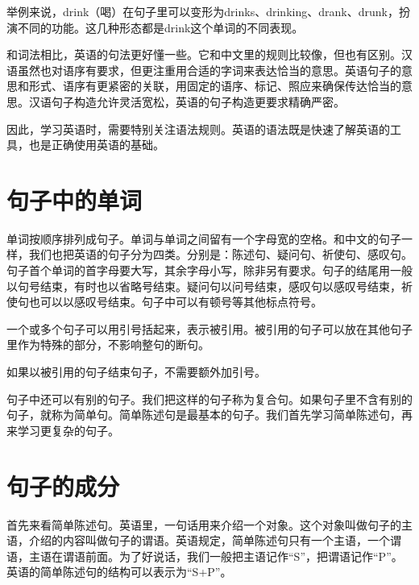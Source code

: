 \documentclass[10.5pt, a4paper]{ctexbook} %
\begin{document}
举例来说，drink（喝）在句子里可以变形为drinks、drinking、drank、drunk，扮演不同的功能。这几种形态都是drink这个单词的不同表现。

和词法相比，英语的句法更好懂一些。它和中文里的规则比较像，但也有区别。汉语虽然也对语序有要求，但更注重用合适的字词来表达恰当的意思。英语句子的意思和形式、语序有更紧密的关联，用固定的语序、标记、照应来确保传达恰当的意思。汉语句子构造允许灵活宽松，英语的句子构造更要求精确严密。

因此，学习英语时，需要特别关注语法规则。英语的语法既是快速了解英语的工具，也是正确使用英语的基础。

\section{句子中的单词}

单词按顺序排列成句子。单词与单词之间留有一个字母宽的空格。和中文的句子一样，我们也把英语的句子分为四类。分别是：陈述句、疑问句、祈使句、感叹句。句子首个单词的首字母要大写，其余字母小写，除非另有要求。句子的结尾用一般以句号结束，有时也以省略号结束。疑问句以问号结束，感叹句以感叹号结束，祈使句也可以以感叹号结束。句子中可以有顿号等其他标点符号。

一个或多个句子可以用引号括起来，表示被引用。被引用的句子可以放在其他句子里作为特殊的部分，不影响整句的断句。

\begin{liju}
\end{liju}

如果以被引用的句子结束句子，不需要额外加引号。

句子中还可以有别的句子。我们把这样的句子称为复合句。如果句子里不含有别的句子，就称为简单句。简单陈述句是最基本的句子。我们首先学习简单陈述句，再来学习更复杂的句子。

\section{句子的成分}

首先来看简单陈述句。英语里，一句话用来介绍一个对象。这个对象叫做句子的主语，介绍的内容叫做句子的谓语。英语规定，简单陈述句只有一个主语，一个谓语，主语在谓语前面。为了好说话，我们一般把主语记作“S”，把谓语记作“P”。英语的简单陈述句的结构可以表示为“S\;+\;P”。
\end{document}
